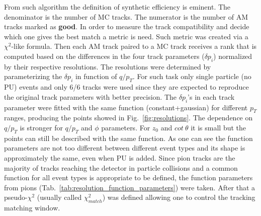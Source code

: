From such algorithm the definition of synthetic efficiency is eminent. The denominator is the number of MC tracks. The numerator is the number of AM tracks marked as \textbf{good}. In order to measure the track compatibility and decide which one gives the best match a metric is need. Such metric was created via a $\chi^2$-like formula. Then each AM track paired to a MC track receives a rank that is computed based on the differences in the four track parameters ($\delta p_{i}$) normalized by their respective resolutions. The resolutions were determined by parameterizing the $\delta p_{i}$ in function of $q/p_{T}$. For such task only single particle (no PU) events and only 6/6 tracks were used since they are expected to reproduce the original track parameters with better precision. The $\delta p_{i}$'s in each track parameter were fitted with the same function (constant+gaussian) for different $p_{T}$ ranges, producing the points showed in Fig.~\ref{fig:resolutions}. The dependence on $q/p_{T}$ is stronger for $q/p_{T}$ and $\phi$ parameters. For $z_{0}$ and $cot~\theta$ it is small but the points can still be described with the same function. As one can see the function parameters are not too different between different event types and its shape is approximately the same, even when PU is added. Since pion tracks are the majority of tracks reaching the detector in particle collisions and a common function for all event types is appropriate to be defined, the function parameters from pions (Tab.~\ref{tab:resolution_function_parameters}) were taken.  After that a pseudo-$\chi^{2}$ (usually called $\chi^{2}_{match}$) was defined allowing one to control the tracking matching window.

